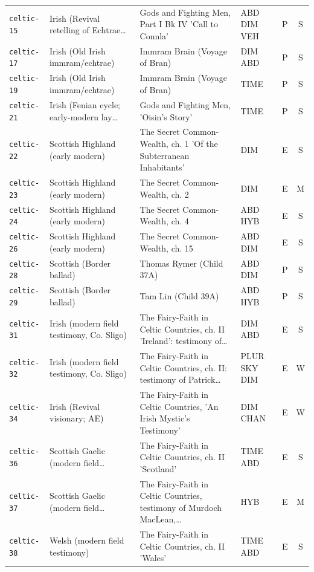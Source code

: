 \documentclass[11pt,a4paper]{article}
\begin{document}
\begin{longtable}{@{}p{1.6cm}p{3.6cm}p{6.9cm}p{2.1cm}cc@{}}
\texttt{celtic-15} & Irish (Revival retelling of Echtrae… & Gods and Fighting Men, Part I Bk IV 'Call to Connla' & ABD DIM VEH & P & S \\
\texttt{celtic-17} & Irish (Old Irish immram/echtrae) & Immram Brain (Voyage of Bran) & DIM ABD & P & S \\
\texttt{celtic-19} & Irish (Old Irish immram/echtrae) & Immram Brain (Voyage of Bran) & TIME & P & S \\
\texttt{celtic-21} & Irish (Fenian cycle; early-modern lay… & Gods and Fighting Men, 'Oisin's Story' & TIME & P & S \\
\texttt{celtic-22} & Scottish Highland (early modern) & The Secret Common-Wealth, ch. 1 'Of the Subterranean Inhabitants' & DIM & E & S \\
\texttt{celtic-23} & Scottish Highland (early modern) & The Secret Common-Wealth, ch. 2 & DIM & E & M \\
\texttt{celtic-24} & Scottish Highland (early modern) & The Secret Common-Wealth, ch. 4 & ABD HYB & E & S \\
\texttt{celtic-26} & Scottish Highland (early modern) & The Secret Common-Wealth, ch. 15 & ABD DIM & E & S \\
\texttt{celtic-28} & Scottish (Border ballad) & Thomas Rymer (Child 37A) & ABD DIM & P & S \\
\texttt{celtic-29} & Scottish (Border ballad) & Tam Lin (Child 39A) & ABD HYB & P & S \\
\texttt{celtic-31} & Irish (modern field testimony, Co. Sligo) & The Fairy-Faith in Celtic Countries, ch. II 'Ireland': testimony of… & DIM ABD & E & S \\
\texttt{celtic-32} & Irish (modern field testimony, Co. Sligo) & The Fairy-Faith in Celtic Countries, ch. II: testimony of Patrick… & PLUR SKY DIM & E & W \\
\texttt{celtic-34} & Irish (Revival visionary; AE) & The Fairy-Faith in Celtic Countries, 'An Irish Mystic's Testimony' & DIM CHAN & E & W \\
\texttt{celtic-36} & Scottish Gaelic (modern field… & The Fairy-Faith in Celtic Countries, ch. II 'Scotland' & TIME ABD & E & S \\
\texttt{celtic-37} & Scottish Gaelic (modern field… & The Fairy-Faith in Celtic Countries, testimony of Murdoch MacLean,… & HYB & E & M \\
\texttt{celtic-38} & Welsh (modern field testimony) & The Fairy-Faith in Celtic Countries, ch. II 'Wales' & TIME ABD & E & S \\

\end{longtable}
\end{document}
